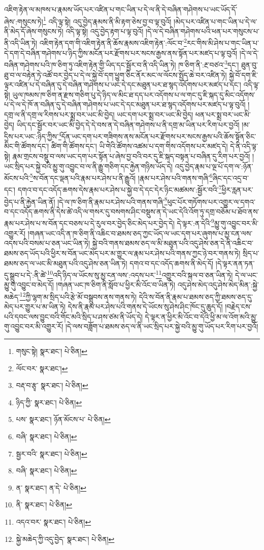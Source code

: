 འཇིག་རྟེན་ལ་མཁས་པ་རྣམས་ཡོད་པར་འཛིན་པ་གང་ཡིན་པ་དེ་ལ་ནི་དེ་བཞིན་གཤེགས་པ་ཡང་ཡོད་དོ་ཞེས་:གསུངས་ཏེ།\footnote{གསུང་སྟེ།  སྣར་ཐང་།  པེ་ཅིན། } འདི་ལྟ་སྟེ། འདུ་བྱེད་རྣམས་ནི་མི་རྟག་ཅེས་བྱ་བ་ལྟ་བུའོ། །མེད་པར་འཛིན་པ་གང་ཡིན་པ་དེ་ལ་ནི་མེད་དོ་ཞེས་གསུངས་ཏེ། འདི་ལྟ་སྟེ། འདུ་བྱེད་རྟག་པ་ལྟ་བུའོ། །དེ་ལ་དེ་བཞིན་གཤེགས་པའི་ཕན་པར་གསུངས་པ་ནི་འདི་ཡིན་ཏེ། འཇིག་རྟེན་དག་གི་འཇིག་རྟེན་ནི་ཆོས་རྣམས་འཇིག་རྟེན་:ལོང་བ་\footnote{ལོང་བར་  སྣར་ཐང་། }རང་གིས་མི་ཤེས་པ་གང་ཡིན་པ་དེ་དག་དེ་བཞིན་གཤེགས་པ་ཉིད་ཀྱིས་མངོན་པར་རྫོགས་པར་སངས་རྒྱས་ནས་སྟོན་པར་མཛད་པ་ལྟ་བུའོ། །དེ་ལ་དེ་བཞིན་གཤེགས་པའི་ཁ་ཅིག་ཏུ་འཇིག་རྟེན་གྱི་ཡིད་དང་སྦྱོར་བ་ནི་འདི་ཡིན་ཏེ། ཁ་ཅིག་ནི་:རྔ་བཙའ་\footnote{བརྡ་བ་རྩྭ་  སྣར་ཐང་།  པེ་ཅིན། }དང་། ཐུན་བུ་ཐུ་བ་ལ་བརྟེན་ཏེ་འཚོ་བར་བྱེད་པ་དེ་ལ་སྐྱེ་བོ་དག་ཕྱུག་ཅིང་ནོར་མང་ལ་ལོངས་སྤྱོད་ཆེ་བར་འཛིན་ཏེ། སྐྱེ་བོ་དག་ཇི་ལྟར་འཛིན་པ་དེ་བཞིན་དུ་དེ་བཞིན་གཤེགས་པ་ཡང་དེ་དང་མཐུན་པར་ཐ་སྙད་འདོགས་པར་མཛད་པ་དང་། འདི་ལྟ་སྟེ། ཡུལ་ཁམས་ཁ་ཅིག་ན་རྫས་གཅིག་པུ་དེ་ཉིད་ལ་མིང་ཐ་དད་པར་འདོགས་པ་ལ་གང་དུ་ཇི་སྐད་དུ་མིང་འདོགས་པ་དེ་ལ་དེ་ཁོ་ན་བཞིན་དུ་དེ་བཞིན་གཤེགས་པ་ཡང་དེ་དང་མཐུན་པར་ཐ་སྙད་འདོགས་པར་མཛད་པ་ལྟ་བུའོ། །དགྲ་ལ་ནི་དགྲ་ལ་རིགས་པར་སྨྲ་བར་ཡང་མི་བྱེད། ཡང་དག་པར་སྨྲ་བར་ཡང་མི་བྱེད། ཕན་པར་སྨྲ་བར་ཡང་མི་བྱེད། ཡིད་དང་སྦྱོར་བར་ཡང་མི་བྱེད་དེ་དེ་བས་ན་དེ་བཞིན་གཤེགས་པ་ནི་དགྲ་མ་ཡིན་པར་རིག་པར་བྱའོ། །མ་དྲིས་པར་ཡང་:ཉིད་ཀྱིས་\footnote{ཉིད་ཀྱི་  སྣར་ཐང་།  པེ་ཅིན། }དོན་ཡང་དག་པར་གཟིགས་ནས་མངོན་པར་རྫོགས་པར་སངས་རྒྱས་པའི་ཆོས་སྟོན་ཅིང་མིང་གི་ཚོགས་དང་། ཚིག་གི་ཚོགས་དང་། ཡི་གེའི་ཚོགས་འཚམ་པ་དག་གིས་འདོགས་པར་མཛད་དེ། དེ་ནི་འདི་ལྟ་སྟེ། རྣམ་གྲངས་བསྡུ་བ་ལས་ཡང་དག་པར་སྟོན་པ་ཞེས་བྱ་བའི་བར་དུ་ཇི་སྐད་བསྟན་པ་བཞིན་དུ་རིག་པར་བྱའོ། །ཡང་སྲིད་པར་སྐྱེ་བའི་མྱུ་གུ་འབྱུང་བ་ལ་ནི་རྒྱུ་གཅིག་དང་རྐྱེན་གཉིས་ཡོད་དེ། འདུ་བྱེད་རྣམ་པ་ལྔ་པོ་དག་ལ་:ཉོན་མོངས་པའི་\footnote{པས་  སྣར་ཐང་། ཉོན་མོངས་པ་  པེ་ཅིན། }ས་བོན་དང་ལྡན་པའི་རྣམ་པར་ཤེས་པ་ནི་རྒྱུའོ། །རྣམ་པར་ཤེས་པའི་གནས་གཞི་\footnote{བཞི་  སྣར་ཐང་།  པེ་ཅིན། }ཞིང་དང་འདྲ་བ་དང་། དགའ་བ་དང་འདོད་ཆགས་དེས་རྣམ་པར་ཤེས་པ་སྐྱེ་བ་དེ་དང་དེར་ཉིང་མཚམས་:སྦྱོར་བའི་\footnote{སྦྱར་བའི་  སྣར་ཐང་།  པེ་ཅིན། }ཕྱིར་རླན་པར་བྱེད་པ་ནི་རྐྱེན་ཡིན་ནོ། །དེ་ལ་ཁ་ཅིག་ནི་རྣམ་པར་ཤེས་པའི་གནས་གཞི་\footnote{བཞི་  སྣར་ཐང་།  པེ་ཅིན། }ཕུང་པོར་གཏོགས་པར་འགྱུར་ལ་དགའ་བ་དང་འདོད་ཆགས་ནི་དེས་ཚེ་འདི་ལ་གསར་དུ་བསགས་ཤིང་བསྡུས་ན་དེ་ཡང་དེའི་འོག་ཏུ་དགྲ་བཅོམ་པ་ཐོབ་ནས་རྣམ་པར་ཤེས་པ་ས་བོན་དང་བཅས་པ་དེ་རུལ་བར་བྱེད་ཅིང་མེད་པར་བྱེད་དེ། དེ་ལྟར་:ན་དེའི་\footnote{ན་  སྣར་ཐང་། ན་དེ་  པེ་ཅིན། }མྱུ་གུ་འབྱུང་བར་མི་འགྱུར་རོ། །གཞན་ཡང་འདི་ན་ཁ་ཅིག་ནི་འཆིང་བ་ཐམས་ཅད་ཀྱང་ཡོད་ལ་ཡང་དག་པར་ཞུགས་པ་མྱ་ངན་ལས་འདས་པའི་བསམ་པ་ཅན་ཡང་ཡིན་ཏེ། སྐྱེ་བའི་གནས་ཐམས་ཅད་ལ་མི་མཐུན་པའི་འདུ་ཤེས་ཅན་དེ་ནི་འཆིང་བ་ཐམས་ཅད་ཡོད་པའི་ཕྱིར་ས་བོན་ཡང་མེད་པར་མ་གྱུར་ལ་རྣམ་པར་ཤེས་པའི་གནས་ཀྱང་ཉེ་བར་གནས་ཏེ། སྲིད་པ་ཐམས་ཅད་ལ་ཡང་མི་མཐུན་པའི་འདུ་ཤེས་ཅན་ཡིན་ཏེ། དགའ་བ་དང་འདོད་ཆགས་ནི་མེད་དོ། །དེ་ལྟར་ནན་ཏན་དུ་སྒྲུབ་པ་དེ་:ནི་ཚེ་\footnote{ནི་  སྣར་ཐང་།  པེ་ཅིན། }འདི་ཉིད་ལ་ཡོངས་སུ་མྱ་ངན་ལས་:འདས་པར་\footnote{འདའ་བར་  སྣར་ཐང་།  པེ་ཅིན། }འགྱུར་བའི་སྐལ་བ་ཅན་ཡིན་ཏེ། དེ་ལ་ཡང་མྱུ་གུ་འབྱུང་བ་མེད་དོ། །གཞན་ཡང་ཁ་ཅིག་ནི་སློབ་པ་ཕྱིར་མི་འོང་བ་ཡིན་ཏེ། འདུ་ཤེས་མེད་འདུ་ཤེས་མེད་མིན་:སྐྱེ་མཆེད་\footnote{སྐྱེ་མཆེད་ཀྱི་འདུ་བྱེད་  སྣར་ཐང་།  པེ་ཅིན། }ཀྱི་ལྷག་མ་སྲིད་པའི་རྩེ་མོ་བསྒྲུབས་ནས་གནས་ཏེ། དེའི་ས་བོན་ནི་རྣམ་པ་ཐམས་ཅད་ཀྱི་ཐམས་ཅད་དུ་མེད་པར་གྱུར་པ་མ་ཡིན་ཏེ། དེས་ནི་རྣམ་པར་ཤེས་པའི་གནས་དེ་ཡོངས་སུ་ཤེས་ཤིང་ཁོང་དུ་ཆུད་དོ། །བརྗེད་ངས་པའི་དབང་ལས་བྱུང་བའི་གོང་མའི་སྲིད་པ་ཤས་ཙམ་ནི་ཡོད་དེ། དེ་ལྟར་ན་ཕྱིར་མི་འོང་བ་དེའི་ཕྱི་མ་ལ་འོག་མའི་མྱུ་གུ་འབྱུང་བར་མི་འགྱུར་རོ། །དེ་ལས་བཟློག་པ་ཐམས་ཅད་ལ་ནི་ཡང་སྲིད་པར་སྐྱེ་བའི་མྱུ་གུ་ཡོད་པར་རིག་པར་བྱའོ། 